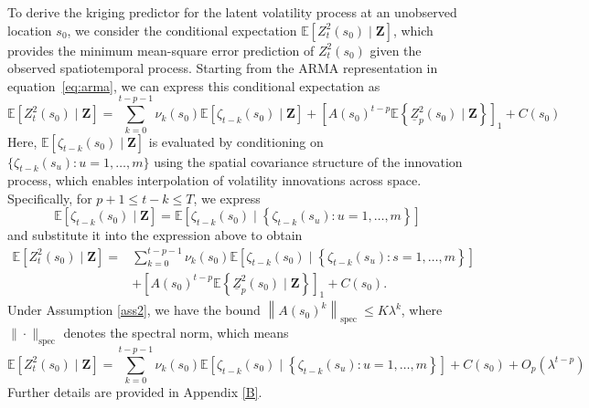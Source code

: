 \documentclass[fleqn,11pt]{article}
\begin{document}
To derive the kriging predictor for the latent volatility process at an unobserved location $s_0$, we consider the conditional expectation $\mathbb{E}[Z_t^2(s_0) \mid \mathbf{Z}]$, which provides the minimum mean-square error prediction of $Z_t^2(s_0)$ given the observed spatiotemporal process. Starting from the ARMA representation in equation~\eqref{eq:arma}, we can express this conditional expectation as
\begin{equation}
   \mathbb{E}\left[Z_t^2\left(s_0\right) \mid \mathbf{Z}\right]=\sum_{k=0}^{t-p-1} \nu_k\left(s_0\right) \mathbb{E}\left[\zeta_{t-k}\left(s_0\right) \mid \mathbf{Z}\right]+\left[A\left(s_0\right)^{t-p} \mathbb{E}\left\{\underline{Z}_p^2\left(s_0\right) \mid \mathbf{Z}\right\}\right]_1 + C(s_0) 
\end{equation}
Here, $\mathbb{E}[\zeta_{t-k}(s_0) \mid \mathbf{Z}]$ is evaluated by conditioning on $\{\zeta_{t-k}(s_u): u = 1, \dots, m\}$ using the spatial covariance structure of the innovation process, which enables interpolation of volatility innovations across space. Specifically, for $p+1 \leq t-k \leq T$, we express
\begin{equation}
\mathbb{E}\left[\zeta_{t-k}\left(s_0\right) \mid \mathbf{Z}\right]=\mathbb{E}\left[\zeta_{t-k}\left(s_0\right) \mid\left\{\zeta_{t-k}\left(s_u\right): u=1, \ldots, m\right\}\right]
\end{equation}
and substitute it into the expression above to obtain 
\begin{eqnarray}
\mathbb{E}\left[Z_t^2\left(s_0\right) \mid \mathbf{Z}\right]= & \sum_{k=0}^{t-p-1} \nu_k\left(s_0\right) \mathbb{E}\left[\zeta_{t-k}\left(s_0\right) \mid\left\{\zeta_{t-k}\left(s_u\right): s=1, \ldots, m\right\}\right] \\
& +\left[A\left(s_0\right)^{t-p} \mathbb{E}\left\{\underline{Z}_p^2\left(s_0\right) \mid \mathbf{Z}\right\}\right]_1     + C(s_0)  .
\end{eqnarray}
Under Assumption  \ref{ass2}, we have the bound $\left\|A\left(s_0\right)^k\right\|_{\text {spec }} \leq K  \lambda^k$, where $\| \cdot\|_{\text{spec}}$ denotes the spectral norm, which means
\begin{equation}\label{eq3}
\mathbb{E}\left[Z_t^2\left(s_0\right) \mid \mathbf{Z}\right] = \sum_{k=0}^{t-p-1} \nu_k\left(s_0\right) \mathbb{E}\left[\zeta_{t-k}\left(s_0\right) \mid\left\{\zeta_{t-k}\left(s_u\right): u=1, \ldots, m\right\}\right]+  C(s_0)   + O_p\left(\lambda^{t-p}\right)
\end{equation}
Further details are provided in Appendix \ref{B}.
\end{document}
